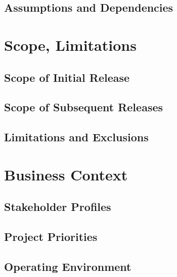 \documentclass[12pt, letterpaper]{article}
\begin{document}
\subsection{Assumptions and Dependencies}

\section{Scope, Limitations}
\subsection{Scope of Initial Release}
\subsection{Scope of Subsequent Releases}
\subsection{Limitations and Exclusions}

\section{Business Context}
\subsection{Stakeholder Profiles}
\subsection{Project Priorities}
\subsection{Operating Environment}

{}

\end{document}
